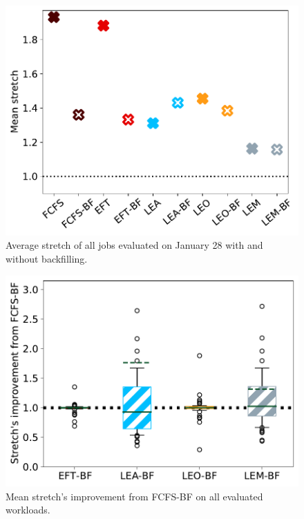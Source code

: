 \documentclass[conference,10pt]{IEEEtran}
\begin{document}
\begin{figure}[t]\centering\includegraphics[width=0.9\linewidth]{../MBSS/plot/BF_AND_NON_BF_Results_FCFS_Score_Backfill_2022-01-28->2022-01-28_V10000_Mean_Stretch_450_128_32_256_4_1024.pdf}\caption{Average stretch of all jobs evaluated on January 28 with and without backfilling.}\label{stretch.01-28}\end{figure}
\begin{figure}[t]\centering\includegraphics[width=0.9\linewidth]{../MBSS/plot/Boxplot/box_plot_mean_stretch_all_workloads_bf.pdf}\caption{Mean stretch's improvement from FCFS-BF on all evaluated workloads.}\label{boxplot.all_bf}\end{figure}
\end{document}

